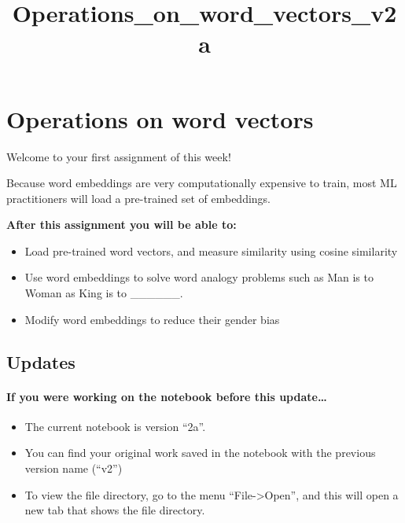 \documentclass[11pt]{article}
\title{Operations\_on\_word\_vectors\_v2a}
\begin{document}
    
    
    \maketitle
    
    

    
    \section{Operations on word vectors}\label{operations-on-word-vectors}

Welcome to your first assignment of this week!

Because word embeddings are very computationally expensive to train,
most ML practitioners will load a pre-trained set of embeddings.

\textbf{After this assignment you will be able to:}

\begin{itemize}
\itemsep1pt\parskip0pt
\item
  Load pre-trained word vectors, and measure similarity using cosine
  similarity
\item
  Use word embeddings to solve word analogy problems such as Man is to
  Woman as King is to \_\_\_\_\_\_.
\item
  Modify word embeddings to reduce their gender bias
\end{itemize}

    \subsection{Updates}\label{updates}

\paragraph{If you were working on the notebook before this
update\ldots{}}\label{if-you-were-working-on-the-notebook-before-this-update}

\begin{itemize}
\itemsep1pt\parskip0pt
\item
  The current notebook is version ``2a''.
\item
  You can find your original work saved in the notebook with the
  previous version name (``v2'')
\item
  To view the file directory, go to the menu
  ``File-\textgreater{}Open'', and this will open a new tab that shows
  the file directory.
\end{itemize}
\end{document}
